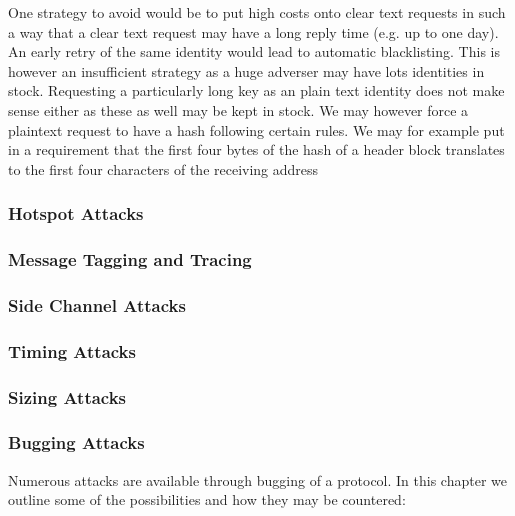 One strategy to avoid would be to put high costs onto clear text requests in such a way that a clear text request may have a long reply time (e.g. up to one day). An early retry of the same identity would lead to automatic blacklisting. This is however an insufficient strategy as a huge adverser may have lots identities in stock. Requesting a particularly long key as an plain text identity does not make sense either as these as well may be kept in stock. We may however force a plaintext request to have a hash following certain rules. We may for example put in a requirement that the first four bytes of the hash of a header block translates to the first four characters of the receiving address



\subsubsection{Hotspot Attacks}

\subsubsection{Message Tagging and Tracing}

\subsubsection{Side Channel Attacks}

\subsubsection{Timing Attacks}

\subsubsection{Sizing Attacks}

\subsubsection{Bugging Attacks}
Numerous attacks are available through bugging of a protocol. In this chapter we outline some of the possibilities and how they may be countered:

